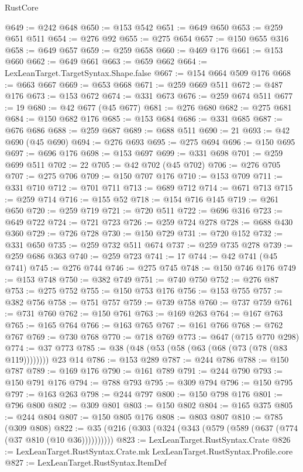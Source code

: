 \begin{lexlean}{RustCore}
\begin{coremodule}
@649 := @242 @648
@650 := @153 @542
@651 := @649 @650
@653 := @259 @651 @511
@654 := @276 @92
@655 := @275 @654
@657 := @150 @655 @316
@658 := @649 @657
@659 := @259 @658
@660 := @469 @176
@661 := @153 @660
@662 := @649 @661
@663 := @659 @662
@664 := LexLeanTarget.TargetSyntax.Shape.false
@667 := @154 @664 @509 @176
@668 := @663 @667
@669 := @653 @668
@671 := @259 @669 @511
@672 := @487 @176
@673 := @153 @672
@674 := @331 @673
@676 := @259 @674 @511
@677 := 19
@680 := @42 @677 (@45 @677)
@681 := @276 @680
@682 := @275 @681
@684 := @150 @682 @176
@685 := @153 @684
@686 := @331 @685
@687 := @676 @686
@688 := @259 @687
@689 := @688 @511
@690 := 21
@693 := @42 @690 (@45 @690)
@694 := @276 @693
@695 := @275 @694
@696 := @150 @695
@697 := @696 @176
@698 := @153 @697
@699 := @331 @698
@701 := @259 @699 @511
@702 := 22
@705 := @42 @702 (@45 @702)
@706 := @276 @705
@707 := @275 @706
@709 := @150 @707 @176
@710 := @153 @709
@711 := @331 @710
@712 := @701 @711
@713 := @689 @712
@714 := @671 @713
@715 := @259 @714
@716 := @155 @52
@718 := @154 @716 @145
@719 := @261 @650
@720 := @259 @719
@721 := @720 @511
@722 := @696 @316
@723 := @649 @722
@724 := @721 @723
@726 := @259 @724 @278
@728 := @688 @430 @360
@729 := @726 @728
@730 := @150 @729
@731 := @720 @152
@732 := @331 @650
@735 := @259 @732 @511 @674
@737 := @259 @735 @278
@739 := @259 @686 @363
@740 := @259 @723
@741 := 17
@744 := @42 @741 (@45 @741)
@745 := @276 @744
@746 := @275 @745
@748 := @150 @746 @176
@749 := @153 @748
@750 := @382 @749
@751 := @740 @750
@752 := @276 @87
@753 := @275 @752
@755 := @150 @753 @176
@756 := @153 @755
@757 := @382 @756
@758 := @751 @757
@759 := @739 @758
@760 := @737 @759
@761 := @731 @760
@762 := @150 @761
@763 := @169 @263
@764 := @167 @763
@765 := @165 @764
@766 := @163 @765
@767 := @161 @766
@768 := @762 @767
@769 := @730 @768
@770 := @718 @769
@773 := @647 (@715 @770 @298)
@774 := @37 @773
@785 := @38 (@48 (@53 (@58 (@63 (@68 (@73 (@78 (@83 @119)))))))) @23 @14
@786 := @153 @289
@787 := @244 @786
@788 := @150 @787
@789 := @169 @176
@790 := @161 @789
@791 := @244 @790
@793 := @150 @791 @176
@794 := @788 @793
@795 := @309 @794
@796 := @150 @795
@797 := @163 @263
@798 := @244 @797
@800 := @150 @798 @176
@801 := @796 @800
@802 := @309 @801
@803 := @150 @802
@804 := @165 @375
@805 := @244 @804
@807 := @150 @805 @176
@808 := @803 @807
@810 := @785 (@309 @808)
@822 := @35 (@216 (@303 (@324 (@343 (@579 (@589 (@637 (@774 (@37 @810 (@10 @36))))))))))
@823 := LexLeanTarget.RustSyntax.Crate
@826 := LexLeanTarget.RustSyntax.Crate.mk LexLeanTarget.RustSyntax.Profile.core
@827 := LexLeanTarget.RustSyntax.ItemDef

\end{coremodule}
\end{lexlean}
